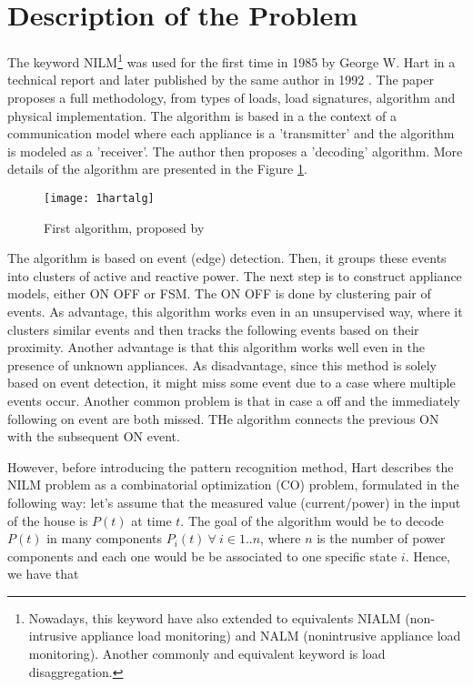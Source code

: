 \section{Description of the Problem}

The keyword NILM\footnote{Nowadays, this keyword have also extended to equivalents NIALM (non-intrusive appliance load monitoring) and NALM (nonintrusive appliance load monitoring). Another commonly and equivalent keyword is load disaggregation.} was used for the first time in 1985 by George W. Hart in a technical report \cite{hart85} and later published by the same author in 1992 \cite{hart}. The paper proposes a full methodology, from types of loads, load signatures, algorithm and physical implementation. The algorithm is based in a the context of a communication model where each appliance is a 'transmitter' and the algorithm is modeled as a 'receiver'. The author then proposes a 'decoding'  algorithm. More details of the algorithm are presented in the Figure \ref{1hartalg}. 

\begin{figure}
    \centering
    \texttt{[image: 1hartalg]}
    \caption{First algorithm, proposed by \cite{hart}}
    \label{1hartalg}
\end{figure}

The algorithm is based on event (edge) detection. Then, it groups these events into clusters of active and reactive power. 
The next step is to construct appliance models, either ON OFF or FSM. The ON OFF is done by clustering pair of events. As advantage, this algorithm works even in an unsupervised way, where it clusters similar events and then tracks the following events based on their proximity. Another advantage is that this algorithm works well even in the presence of unknown appliances. As disadvantage, since this method is solely based on event detection, it might miss some event due to a case where multiple events occur. Another common problem is that in case a off and the immediately following on event are both missed. THe algorithm connects the previous ON with the subsequent ON event. 

However, before introducing the pattern recognition method, Hart describes the NILM problem as a combinatorial optimization (CO) problem, formulated in the following way: let's assume that the measured value (current/power) in the input of the house is $P(t)$ at time $t$. The goal of the algorithm would be to decode $P(t)$ in many components $P_i(t) \ \forall \ i \in 1..n$, where $n$ is the number of power components and each one would be be associated to one specific state $i$. Hence, we have that


